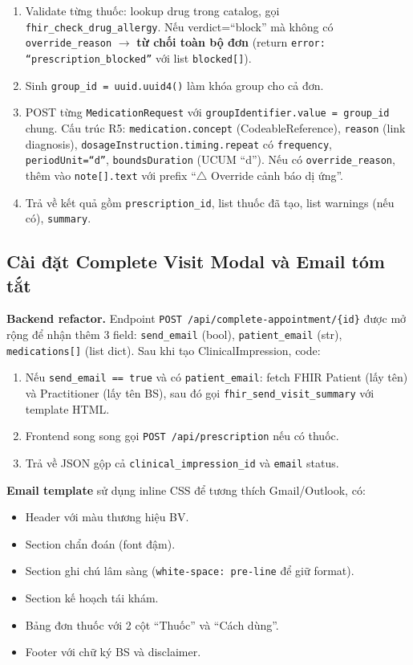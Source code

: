 \documentclass[a4paper,13pt,3p,oneside]{report}
\theoremstyle{definition}
\theoremstyle{remark}
\theoremstyle{definition}
\begin{document}
\begin{enumerate}
  \item Validate từng thuốc: lookup drug trong catalog, gọi \texttt{fhir\_check\_drug\_allergy}. Nếu verdict=``block'' mà không có \texttt{override\_reason} $\to$ \textbf{từ chối toàn bộ đơn} (return \texttt{error: ``prescription\_blocked''} với list \texttt{blocked[]}).
  \item Sinh \texttt{group\_id = uuid.uuid4()} làm khóa group cho cả đơn.
  \item POST từng \texttt{MedicationRequest} với \texttt{groupIdentifier.value = group\_id} chung. Cấu trúc R5: \texttt{medication.concept} (CodeableReference), \texttt{reason} (link diagnosis), \texttt{dosageInstruction.timing.repeat} có \texttt{frequency}, \texttt{periodUnit=``d''}, \texttt{boundsDuration} (UCUM ``d''). Nếu có \texttt{override\_reason}, thêm vào \texttt{note[].text} với prefix ``$\triangle$ Override cảnh báo dị ứng''.
  \item Trả về kết quả gồm \texttt{prescription\_id}, list thuốc đã tạo, list warnings (nếu có), \texttt{summary}.
\end{enumerate}

\subsection{Cài đặt Complete Visit Modal và Email tóm tắt}

\textbf{Backend refactor.} Endpoint \texttt{POST /api/complete-appointment/\{id\}} được mở rộng để nhận thêm 3 field: \texttt{send\_email} (bool), \texttt{patient\_email} (str), \texttt{medications[]} (list dict). Sau khi tạo ClinicalImpression, code:
\begin{enumerate}
  \item Nếu \texttt{send\_email == true} và có \texttt{patient\_email}: fetch FHIR Patient (lấy tên) và Practitioner (lấy tên BS), sau đó gọi \texttt{fhir\_send\_visit\_summary} với template HTML.
  \item Frontend song song gọi \texttt{POST /api/prescription} nếu có thuốc.
  \item Trả về JSON gộp cả \texttt{clinical\_impression\_id} và \texttt{email} status.
\end{enumerate}

\textbf{Email template} sử dụng inline CSS để tương thích Gmail/Outlook, có:
\begin{itemize}
  \item Header với màu thương hiệu BV.
  \item Section chẩn đoán (font đậm).
  \item Section ghi chú lâm sàng (\texttt{white-space: pre-line} để giữ format).
  \item Section kế hoạch tái khám.
  \item Bảng đơn thuốc với 2 cột ``Thuốc'' và ``Cách dùng''.
  \item Footer với chữ ký BS và disclaimer.
\end{itemize}
\end{document}
